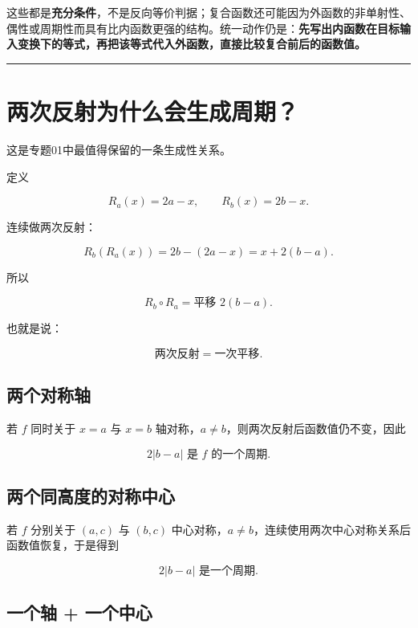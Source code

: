 \documentclass[11pt,a4paper]{ctexart}
\begin{document}
这些都是\textbf{充分条件}，不是反向等价判据；复合函数还可能因为外函数的非单射性、偶性或周期性而具有比内函数更强的结构。统一动作仍是：\textbf{先写出内函数在目标输入变换下的等式，再把该等式代入外函数，直接比较复合前后的函数值。}

\begin{center}\rule{0.5\linewidth}{0.5pt}\end{center}

\section{两次反射为什么会生成周期？}\label{ux4e24ux6b21ux53cdux5c04ux4e3aux4ec0ux4e48ux4f1aux751fux6210ux5468ux671f}

这是专题01中最值得保留的一条生成性关系。

定义

\[
R_a(x)=2a-x,
\qquad
R_b(x)=2b-x.
\]

连续做两次反射：

\[
R_b(R_a(x))
=2b-(2a-x)
=x+2(b-a).
\]

所以

\[
\boxed{R_b\circ R_a=\text{平移 }2(b-a)}.
\]

也就是说：

\[
\boxed{\text{两次反射}=\text{一次平移}.}
\]

\subsection{两个对称轴}\label{ux4e24ux4e2aux5bf9ux79f0ux8f74}

若 \(f\) 同时关于 \(x=a\) 与 \(x=b\)
轴对称，\(a\ne b\)，则两次反射后函数值仍不变，因此

\[
\boxed{2\lvert b-a\rvert\text{ 是 }f\text{ 的一个周期}.}
\]

\subsection{两个同高度的对称中心}\label{ux4e24ux4e2aux540cux9ad8ux5ea6ux7684ux5bf9ux79f0ux4e2dux5fc3}

若 \(f\) 分别关于 \((a,c)\) 与 \((b,c)\)
中心对称，\(a\ne b\)，连续使用两次中心对称关系后函数值恢复，于是得到

\[
\boxed{2\lvert b-a\rvert\text{ 是一个周期}.}
\]

\subsection{一个轴 + 一个中心}\label{ux4e00ux4e2aux8f74-ux4e00ux4e2aux4e2dux5fc3}
\end{document}
